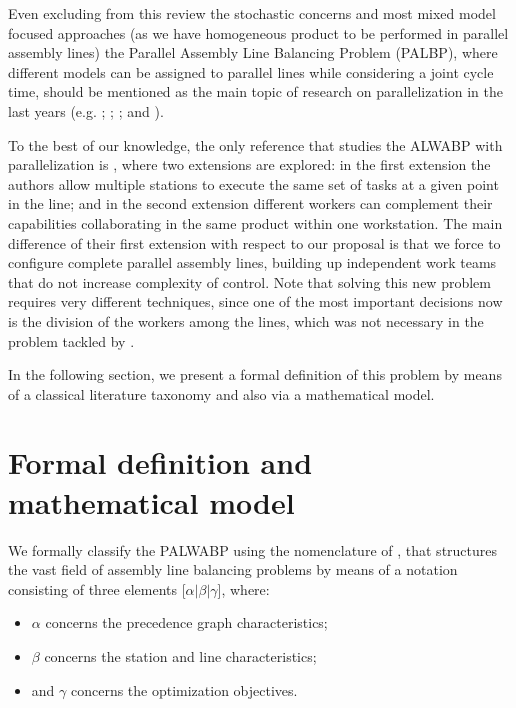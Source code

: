 \documentclass{singlecol-new}
\begin{document}
Even excluding from this review the stochastic concerns and most mixed model focused approaches (as we have homogeneous product to be performed in parallel assembly lines) the Parallel Assembly Line Balancing Problem (PALBP), where different models can be assigned to parallel lines while considering a joint cycle time, should be mentioned as the main topic of research on parallelization in the last years (e.g. \cite{gokcen06balancing}; \cite{scholl09designing}; \cite{kara2010balancing}; and \cite{ozbakir11multiple}).

To the best of our knowledge, the only reference that studies the ALWABP with parallelization is \citep{araujo12two}, where two extensions are explored: in the first extension the authors allow multiple stations to execute the same set of tasks at a given point in the line; and in the second extension different workers can complement their capabilities collaborating in the same product within one workstation. The main difference of their first extension with respect to our proposal is that we force to configure complete parallel assembly lines, building up independent work teams that do not increase complexity of control. Note that solving this new problem requires very different techniques, since one of the most important decisions now is the division of the workers among the lines, which was not necessary in the problem tackled by \cite{araujo12two}. 

In the following section, we present a formal definition of this problem by means of a classical literature taxonomy and also via a mathematical model.

\section{Formal definition and mathematical model} \label{problem}

We formally classify the PALWABP using the nomenclature of \cite{boysen07classification}, that structures the vast field of assembly line balancing problems by means of a notation consisting of three elements [$\alpha$$\vert$$\beta$$\vert$$\gamma$], where: 
\begin{itemize}
	\item $\alpha$ concerns the precedence graph characteristics;
	\item $\beta$ concerns the station and line characteristics;
	\item and $\gamma$ concerns the optimization objectives.
\end{itemize}
\end{document}
